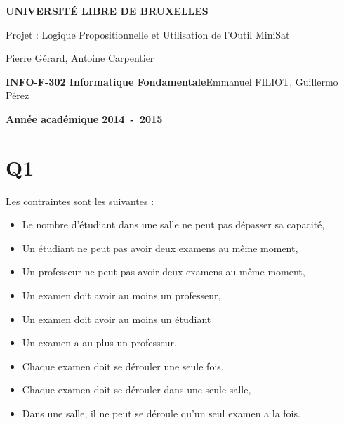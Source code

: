 \documentclass[a4paper,10pt]{article}
\begin{document}
\begin{titlepage}
\begin{center}
\textbf{\textsc{UNIVERSIT\'E LIBRE DE BRUXELLES}}\\
\vfill{}\vfill{}
\begin{center}{\Huge Projet : Logique Propositionnelle et Utilisation de l’Outil MiniSat}\end{center}{\Huge \par}
\begin{center}{\large Pierre Gérard, Antoine Carpentier}\end{center}{\Huge \par}
\vfill{}\vfill{} \vfill{}
\begin{flushleft}{\large \textbf{INFO-F-302 Informatique Fondamentale}}\hfill{Emmanuel FILIOT, Guillermo Pérez}\end{flushleft}{\large\par}
\vfill{}\vfill{}\enlargethispage{3cm}
\textbf{Année académique 2014~-~2015}
\end{center}
\end{titlepage}



\tableofcontents

\pagebreak


\section{Q1}
Les contraintes sont les suivantes :
\begin{itemize}
  \item Le nombre d'étudiant dans une salle ne peut pas dépasser sa capacité,
  \item Un étudiant ne peut pas avoir deux examens au même moment,
  \item Un professeur ne peut pas avoir deux examens au même moment,
  \item Un examen doit avoir au moins un professeur,
  \item Un examen doit avoir au moins un étudiant
  \item Un examen a au plus un professeur,
  \item Chaque examen doit se dérouler une seule fois,
  \item Chaque examen doit se dérouler dans une seule salle,
  \item Dans une salle, il ne peut se déroule qu'un seul examen a la fois.
\end{itemize}
\end{document}
